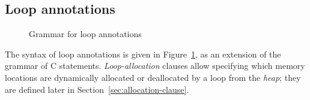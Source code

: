 \subsection{Loop annotations}
\label{sec:loop_annot}

\begin{figure}[htp]
  \begin{cadre}
    
  \end{cadre}
  \caption{Grammar for loop annotations}
  \label{fig:gram:loops}
\end{figure}

The syntax of loop annotations is given in Figure~\ref{fig:gram:loops},
as an extension of the grammar of C statements.
\textsl{Loop-allocation} clauses allow specifying which memory locations
are dynamically allocated or deallocated by a loop from the \textsl{heap};
they are defined later in Section~\ref{sec:allocation-clause}.

